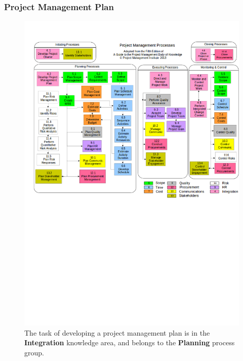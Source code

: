 \documentclass{beamer}
\begin{document}
\begin{frame}
\frametitle{Project Management Plan}
\begin{figure}
\caption{The task of developing a project management plan is in the \textbf{Integration} knowledge area, and belongs to the \textbf{Planning} process group.}
\vspace{-0.8cm}
\includegraphics[scale=0.3]{mapping}
\end{figure}
\end{frame}
\end{document}
